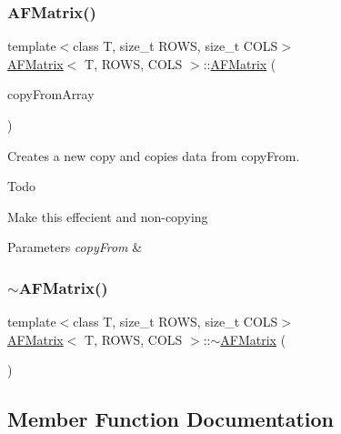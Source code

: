 \subsubsection{\texorpdfstring{A\+F\+Matrix()}{AFMatrix()}\hspace{0.1cm}{\footnotesize\ttfamily [3/3]}}
{\footnotesize\ttfamily template$<$class T, size\+\_\+t R\+O\+WS, size\+\_\+t C\+O\+LS$>$ \\
\hyperlink{class_a_f_matrix}{A\+F\+Matrix}$<$ T, R\+O\+WS, C\+O\+LS $>$\+::\hyperlink{class_a_f_matrix}{A\+F\+Matrix} (\begin{DoxyParamCaption}\item[{array$<$ T, R\+O\+WS $\ast$C\+O\+LS $>$ $\ast$}]{copy\+From\+Array }\end{DoxyParamCaption})\hspace{0.3cm}{\ttfamily [inline]}}

Creates a new copy and copies data from {\ttfamily copy\+From}. \begin{DoxyRefDesc}{Todo}
\item[\hyperlink{todo__todo000003}{Todo}]Make this effecient and non-\/copying \end{DoxyRefDesc}

\begin{DoxyParams}{Parameters}
{\em copy\+From} & \\
\hline
\end{DoxyParams}
\mbox{\label{class_a_f_matrix_a657752979ec2d7bad591e3def1f4bcc7}} 
\subsubsection{\texorpdfstring{$\sim$\+A\+F\+Matrix()}{~AFMatrix()}}
{\footnotesize\ttfamily template$<$class T, size\+\_\+t R\+O\+WS, size\+\_\+t C\+O\+LS$>$ \\
\hyperlink{class_a_f_matrix}{A\+F\+Matrix}$<$ T, R\+O\+WS, C\+O\+LS $>$\+::$\sim$\hyperlink{class_a_f_matrix}{A\+F\+Matrix} (\begin{DoxyParamCaption}{ }\end{DoxyParamCaption})\hspace{0.3cm}{\ttfamily [inline]}}



\subsection{Member Function Documentation}
\mbox{\label{class_a_f_matrix_ac6a47fbe48cd01f2c4859ae78f03ab32}} 
